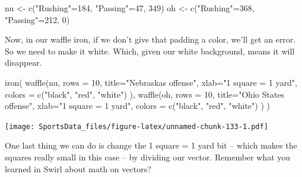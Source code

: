 \documentclass[
]{book}
\newenvironment{Shaded}{\begin{snugshade}}{\end{snugshade}}
\newcommand{\AttributeTok}[1]{\textcolor[rgb]{0.77,0.63,0.00}{#1}}
\newcommand{\DecValTok}[1]{\textcolor[rgb]{0.00,0.00,0.81}{#1}}
\newcommand{\FunctionTok}[1]{\textcolor[rgb]{0.00,0.00,0.00}{#1}}
\newcommand{\NormalTok}[1]{#1}
\newcommand{\OtherTok}[1]{\textcolor[rgb]{0.56,0.35,0.01}{#1}}
\newcommand{\StringTok}[1]{\textcolor[rgb]{0.31,0.60,0.02}{#1}}
\begin{document}
\begin{Shaded}
\begin{Highlighting}[]
\NormalTok{nu }\OtherTok{\textless{}{-}} \FunctionTok{c}\NormalTok{(}\StringTok{"Rushing"}\OtherTok{=}\DecValTok{184}\NormalTok{, }\StringTok{"Passing"}\OtherTok{=}\DecValTok{47}\NormalTok{, }\DecValTok{349}\NormalTok{)}
\NormalTok{oh }\OtherTok{\textless{}{-}} \FunctionTok{c}\NormalTok{(}\StringTok{"Rushing"}\OtherTok{=}\DecValTok{368}\NormalTok{, }\StringTok{"Passing"}\OtherTok{=}\DecValTok{212}\NormalTok{, }\DecValTok{0}\NormalTok{)}
\end{Highlighting}
\end{Shaded}

Now, in our waffle iron, if we don't give that padding a color, we'll get an error. So we need to make it white. Which, given our white background, means it will disappear.

\begin{Shaded}
\begin{Highlighting}[]
\FunctionTok{iron}\NormalTok{(}
 \FunctionTok{waffle}\NormalTok{(nu, }
        \AttributeTok{rows =} \DecValTok{10}\NormalTok{, }
        \AttributeTok{title=}\StringTok{"Nebraska\textquotesingle{}s offense"}\NormalTok{, }
        \AttributeTok{xlab=}\StringTok{"1 square = 1 yard"}\NormalTok{, }
        \AttributeTok{colors =} \FunctionTok{c}\NormalTok{(}\StringTok{"black"}\NormalTok{, }\StringTok{"red"}\NormalTok{, }\StringTok{"white"}\NormalTok{)}
\NormalTok{        ),}
 \FunctionTok{waffle}\NormalTok{(oh, }
        \AttributeTok{rows =} \DecValTok{10}\NormalTok{, }
        \AttributeTok{title=}\StringTok{"Ohio State\textquotesingle{}s offense"}\NormalTok{, }
        \AttributeTok{xlab=}\StringTok{"1 square = 1 yard"}\NormalTok{, }
        \AttributeTok{colors =} \FunctionTok{c}\NormalTok{(}\StringTok{"black"}\NormalTok{, }\StringTok{"red"}\NormalTok{, }\StringTok{"white"}\NormalTok{)}
\NormalTok{        )}
\NormalTok{)}
\end{Highlighting}
\end{Shaded}

\texttt{[image: SportsData\_files/figure-latex/unnamed-chunk-133-1.pdf]}

One last thing we can do is change the 1 square = 1 yard bit -- which makes the squares really small in this case -- by dividing our vector. Remember what you learned in Swirl about math on vectors?
\end{document}
